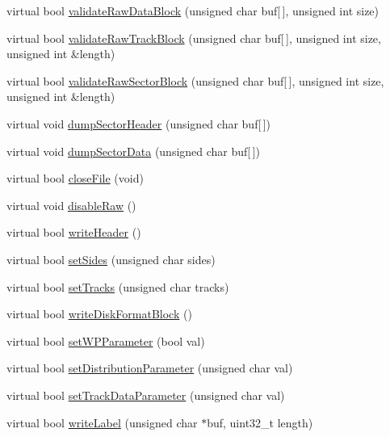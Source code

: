 \begin{DoxyCompactItemize}
\item 
virtual bool \hyperlink{classH17Disk_ae1f57f11daa4d4c624d255851838d704}{validate\+Raw\+Data\+Block} (unsigned char buf\mbox{[}$\,$\mbox{]}, unsigned int size)
\item 
virtual bool \hyperlink{classH17Disk_a8f0fa7dbd52e633a2faa267e453cc486}{validate\+Raw\+Track\+Block} (unsigned char buf\mbox{[}$\,$\mbox{]}, unsigned int size, unsigned int \&length)
\item 
virtual bool \hyperlink{classH17Disk_a60b9074cacd5a89f4b8e8dfb37bccf08}{validate\+Raw\+Sector\+Block} (unsigned char buf\mbox{[}$\,$\mbox{]}, unsigned int size, unsigned int \&length)
\item 
virtual void \hyperlink{classH17Disk_a63841bed6a8d9e91a221dc5f72672710}{dump\+Sector\+Header} (unsigned char buf\mbox{[}$\,$\mbox{]})
\item 
virtual void \hyperlink{classH17Disk_a8748c1a43e28a7bb8cea81e837964c54}{dump\+Sector\+Data} (unsigned char buf\mbox{[}$\,$\mbox{]})
\item 
virtual bool \hyperlink{classH17Disk_a6246024e33209823c50cb30d4ea18d2c}{close\+File} (void)
\item 
virtual void \hyperlink{classH17Disk_aadb042dda8ca52912ce9c76aaa7ca9e5}{disable\+Raw} ()
\item 
virtual bool \hyperlink{classH17Disk_a8390bffa0553266decd2e1c21831ea5f}{write\+Header} ()
\item 
virtual bool \hyperlink{classH17Disk_a40df944449f21c6f5319024f0e179f7c}{set\+Sides} (unsigned char sides)
\item 
virtual bool \hyperlink{classH17Disk_a2e492914d9f408f25f1223253d20f5bc}{set\+Tracks} (unsigned char tracks)
\item 
virtual bool \hyperlink{classH17Disk_a888f6eb9e66d45410eb80903df0133d3}{write\+Disk\+Format\+Block} ()
\item 
virtual bool \hyperlink{classH17Disk_aeedd102e18abe2cdcf8630d3cdc5492e}{set\+W\+P\+Parameter} (bool val)
\item 
virtual bool \hyperlink{classH17Disk_a9aaab4accbcfce3205c0eadc9679a9f9}{set\+Distribution\+Parameter} (unsigned char val)
\item 
virtual bool \hyperlink{classH17Disk_adda59abe2fa07a5b565f061346e1439a}{set\+Track\+Data\+Parameter} (unsigned char val)
\item 
virtual bool \hyperlink{classH17Disk_ac4229315d8704036fe339189cbb649cb}{write\+Label} (unsigned char $\ast$buf, uint32\+\_\+t length)
\item 

\end{DoxyCompactItemize}

